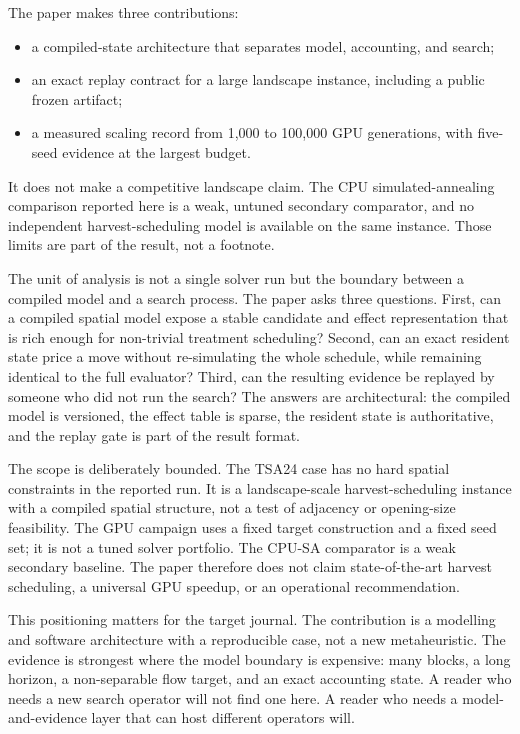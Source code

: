 \documentclass[11pt]{article}
\providecommand{\tightlist}{\setlength{\itemsep}{0pt}\setlength{\parskip}{0pt}}
\begin{document}
The paper makes three contributions:

\begin{itemize}
\tightlist
\item
  a compiled-state architecture that separates model, accounting, and search;
\item
  an exact replay contract for a large landscape instance, including a public frozen artifact;
\item
  a measured scaling record from 1,000 to 100,000 GPU generations, with five-seed evidence at the largest budget.
\end{itemize}

It does not make a competitive landscape claim. The CPU simulated-annealing comparison reported here is a weak, untuned secondary comparator, and no independent harvest-scheduling model is available on the same instance. Those limits are part of the result, not a footnote.

The unit of analysis is not a single solver run but the boundary between a compiled model and a
search process. The paper asks three questions. First, can a compiled spatial model expose a stable
candidate and effect representation that is rich enough for non-trivial treatment scheduling? Second,
can an exact resident state price a move without re-simulating the whole schedule, while remaining
identical to the full evaluator? Third, can the resulting evidence be replayed by someone who did
not run the search? The answers are architectural: the compiled model is versioned, the effect table
is sparse, the resident state is authoritative, and the replay gate is part of the result format.

The scope is deliberately bounded. The TSA24 case has no hard spatial constraints in the reported
run. It is a landscape-scale harvest-scheduling instance with a compiled spatial structure, not a
test of adjacency or opening-size feasibility. The GPU campaign uses a fixed target construction and
a fixed seed set; it is not a tuned solver portfolio. The CPU-SA comparator is a weak secondary
baseline. The paper therefore does not claim state-of-the-art harvest scheduling, a universal GPU
speedup, or an operational recommendation.

This positioning matters for the target journal. The contribution is a modelling and software
architecture with a reproducible case, not a new metaheuristic. The evidence is strongest where the
model boundary is expensive: many blocks, a long horizon, a non-separable flow target, and an exact
accounting state. A reader who needs a new search operator will not find one here. A reader who needs
a model-and-evidence layer that can host different operators will.
\end{document}
